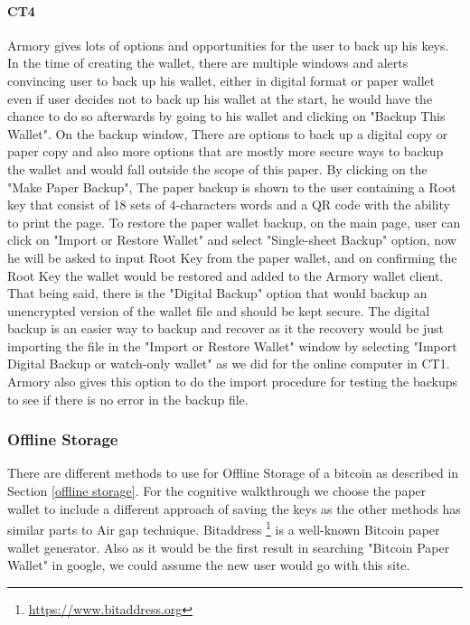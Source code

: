 \paragraph{CT4} 
Armory gives lots of options and opportunities for the user to back up his keys. In the time of creating the wallet, there are multiple windows and alerts convincing user to back up his wallet, either in digital format or paper wallet even if user decides not to back up his wallet at the start, he would have the chance to do so afterwards by going to his wallet and clicking on "Backup This Wallet". On the backup window, There are options to back up a digital copy or paper copy and also more options that are mostly more secure ways to backup the wallet and would fall outside the scope of this paper. By clicking on the "Make Paper Backup", The paper backup is shown to the user containing a Root key that consist of 18 sets of 4-characters words and a QR code with the ability to print the page. To restore the paper wallet backup, on the main page, user can click on "Import or Restore Wallet" and select "Single-sheet Backup" option, now he will be asked to input Root Key from the paper wallet, and on confirming the Root Key the wallet would be restored and added to the Armory wallet client. That being said, there is the "Digital Backup" option that would backup an unencrypted version of the wallet file and should be kept secure. The digital backup is an easier way to backup and recover as it the recovery would be just importing the file in the "Import or Restore Wallet" window by selecting "Import Digital Backup or watch-only wallet" as we did for the online computer in CT1. Armory also gives this option to do the import procedure for testing the backups to see if there is no error in the backup file.



\subsubsection{Offline Storage}
There are different methods to use for Offline Storage of a bitcoin as described in Section \ref{offline storage}. For the cognitive walkthrough we choose the paper wallet to include a different approach of saving the keys as the other methods has similar parts to Air gap technique. Bitaddress \footnote{\url{https://www.bitaddress.org}} is a well-known Bitcoin paper wallet generator. Also as it would be the first result in searching "Bitcoin Paper Wallet" in google, we could assume the new user would go with this site.\\

